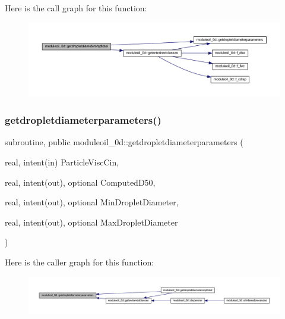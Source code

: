 Here is the call graph for this function\+:\nopagebreak
\begin{figure}[H]
\begin{center}
\leavevmode
\includegraphics[width=350pt]{namespacemoduleoil__0d_a2282beabe04942e12608b16eecc58ffe_cgraph}
\end{center}
\end{figure}
\mbox{\label{namespacemoduleoil__0d_a5770405ab41d32282fda45ba2d2750ef}} 
\subsubsection{\texorpdfstring{getdropletdiameterparameters()}{getdropletdiameterparameters()}}
{\footnotesize\ttfamily subroutine, public moduleoil\+\_\+0d\+::getdropletdiameterparameters (\begin{DoxyParamCaption}\item[{real, intent(in)}]{Particle\+Visc\+Cin,  }\item[{real, intent(out), optional}]{Computed\+D50,  }\item[{real, intent(out), optional}]{Min\+Droplet\+Diameter,  }\item[{real, intent(out), optional}]{Max\+Droplet\+Diameter }\end{DoxyParamCaption})}

Here is the caller graph for this function\+:\nopagebreak
\begin{figure}[H]
\begin{center}
\leavevmode
\includegraphics[width=350pt]{namespacemoduleoil__0d_a5770405ab41d32282fda45ba2d2750ef_icgraph}
\end{center}
\end{figure}
\mbox{\label{namespacemoduleoil__0d_a3dc497493c2537b1f55d043f488bcb36}} 
